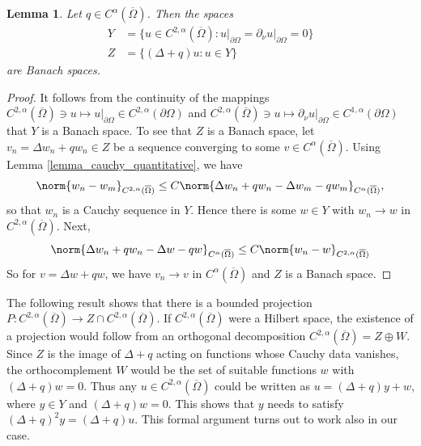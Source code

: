 \documentclass[11pt,a4paper]{amsart}
\newtheorem{Lemma}[Theorem]{Lemma}
\theoremstyle{definition}
\numberwithin{equation}{section}
\newcommand{\ol}[1]{\overline{#1}}
\newcommand{\p}{\partial}
\newcommand{\Om}{\Omega}
\begin{document}
\begin{Lemma}\label{lemma:spaces}
Let $q\in C^{\alpha}(\ol{\Om})$.
Then the spaces
\begin{align*}
	Y &= \{ u\in C^{2,\alpha}(\ol{\Omega}) \colon u\vert_{\p\Om} = \p_{\nu}u\vert_{\p\Om} = 0 \} \\
	Z &= \{ (\Delta + q)u \colon u\in Y \}
\end{align*}
are Banach spaces.
\end{Lemma}
\begin{proof}
It follows from the continuity of the mappings $C^{2,\alpha}(\ol{\Om})\ni u \mapsto u\vert_{\p\Om}\in C^{2,\alpha}(\p\Om)$ and $C^{2,\alpha}(\ol{\Om})\ni u \mapsto \p_{\nu}u\vert_{\p\Om}\in C^{1,\alpha}(\p\Om)$ that $Y$ is a Banach space.
To see that $Z$ is a Banach space, let $v_n = \Delta w_n +qw_n\in Z$ be a sequence converging to some $v\in C^{\alpha}(\ol{\Om})$.
Using Lemma \ref{lemma_cauchy_quantitative}, we have
\begin{equation*}
	\norm{w_n - w_m}_{C^{2,\alpha}(\ol{\Om})} \leq C \norm{\Delta w_n+qw_n - \Delta w_m-qw_m}_{C^{\alpha}(\ol{\Om})},
\end{equation*}
so that $w_n$ is a Cauchy sequence in $Y$.
Hence there is some $w\in Y$ with $w_n\to w$ in $C^{2,\alpha}(\ol{\Om})$.
Next,
\begin{equation*}
	\norm{\Delta w_n+qw_n - \Delta w-qw}_{C^{\alpha}(\ol{\Om})} \leq C\norm{w_n - w}_{C^{2,\alpha}(\ol{\Om})}
\end{equation*}
So for $v = \Delta w+qw$, we have $v_n\to v$ in $C^{\alpha}(\ol{\Om})$ and $Z$ is a Banach space.
\end{proof}

The following result shows that there is a bounded projection $P: C^{2,\alpha}(\ol{\Om}) \to Z\cap C^{2,\alpha}(\ol{\Om})$.
If $C^{2,\alpha}(\ol{\Om})$ were a Hilbert space, the existence of a projection would follow from an orthogonal decomposition $C^{2,\alpha}(\ol{\Om}) = Z \oplus W$.
Since $Z$ is the image of $\Delta+q$ acting on functions whose Cauchy data vanishes, the orthocomplement $W$ would be the set of suitable functions $w$ with $(\Delta+q)w=0$.
Thus any $u \in C^{2,\alpha}(\ol{\Om})$ could be written as $u=(\Delta+q)y+w$, where $y \in Y$ and $(\Delta+q)w=0$.
This shows that $y$ needs to satisfy $(\Delta+q)^2 y = (\Delta+q)u$.
This  formal argument turns out to work also in our case.
\end{document}
